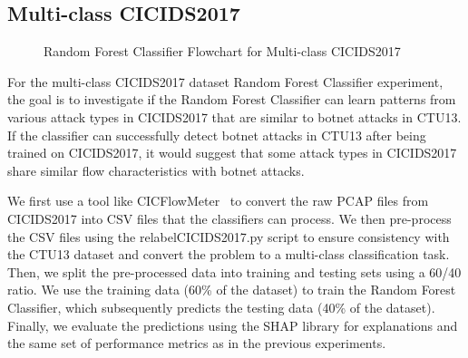 \subsection{Multi-class CICIDS2017}\label{subsec:RandomForestMultiCICIDS2017}
\begin{figure}[H]
\centering
{}
\caption{Random Forest Classifier Flowchart for Multi-class CICIDS2017}\label{fig:RandomForestFlowMultiCICIDS2017}
\end{figure}

For the multi-class CICIDS2017 dataset Random Forest Classifier experiment, the goal is to investigate if the Random Forest Classifier can learn patterns from various attack types in CICIDS2017 that are similar to botnet attacks in CTU13. If the classifier can successfully detect botnet attacks in CTU13 after being trained on CICIDS2017, it would suggest that some attack types in CICIDS2017 share similar flow characteristics with botnet attacks.

We first use a tool like CICFlowMeter~\cite{lashkari2017characterization} to convert the raw PCAP files from CICIDS2017 into CSV files that the classifiers can process. We then pre-process the CSV files using the relabelCICIDS2017.py script to ensure consistency with the CTU13 dataset and convert the problem to a multi-class classification task. Then, we split the pre-processed data into training and testing sets using a 60/40 ratio. We use the training data (60\% of the dataset) to train the Random Forest Classifier, which subsequently predicts the testing data (40\% of the dataset). Finally, we evaluate the predictions using the SHAP library for explanations and the same set of performance metrics as in the previous experiments.

